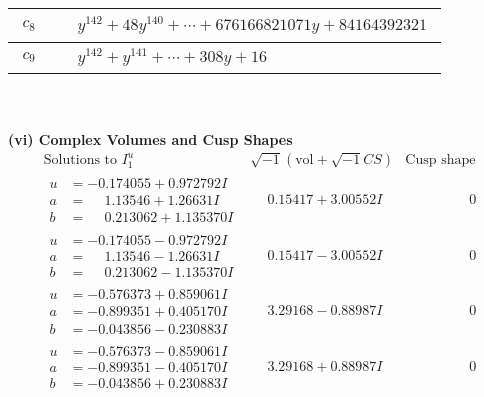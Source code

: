 \documentclass[1p]{elsarticle_modified}
\theoremstyle{definition}
\newcommand{\I}{\sqrt{-1}}
\begin{document}
\begin{tabular}{m{50pt}|m{274pt}}
\hline $$\begin{aligned}c_{8}\end{aligned}$$&$\begin{aligned}
&y^{142}+48 y^{140}+\cdots+676166821071 y+84164392321
\end{aligned}$\\
\hline $$\begin{aligned}c_{9}\end{aligned}$$&$\begin{aligned}
&y^{142}+y^{141}+\cdots+308 y+16
\end{aligned}$\\
\hline
\end{tabular}\\~\\
\newpage\flushleft \textbf{(vi) Complex Volumes and Cusp Shapes}
$$\begin{array}{c|c|c}  
\text{Solutions to }I^u_{1}& \I (\text{vol} + \sqrt{-1}CS) & \text{Cusp shape}\\
 \hline 
\begin{aligned}
u &= -0.174055 + 0.972792 I \\
a &= \phantom{-}1.13546 + 1.26631 I \\
b &= \phantom{-}0.213062 + 1.135370 I\end{aligned}
 & \phantom{-}0.15417 + 3.00552 I & \phantom{-0.000000 } 0 \\ \hline\begin{aligned}
u &= -0.174055 - 0.972792 I \\
a &= \phantom{-}1.13546 - 1.26631 I \\
b &= \phantom{-}0.213062 - 1.135370 I\end{aligned}
 & \phantom{-}0.15417 - 3.00552 I & \phantom{-0.000000 } 0 \\ \hline\begin{aligned}
u &= -0.576373 + 0.859061 I \\
a &= -0.899351 + 0.405170 I \\
b &= -0.043856 - 0.230883 I\end{aligned}
 & \phantom{-}3.29168 - 0.88987 I & \phantom{-0.000000 } 0 \\ \hline\begin{aligned}
u &= -0.576373 - 0.859061 I \\
a &= -0.899351 - 0.405170 I \\
b &= -0.043856 + 0.230883 I\end{aligned}
 & \phantom{-}3.29168 + 0.88987 I & \phantom{-0.000000 } 0 \\ \hline\begin{aligned}

\end{aligned}
\end{array}$$
\end{document}
